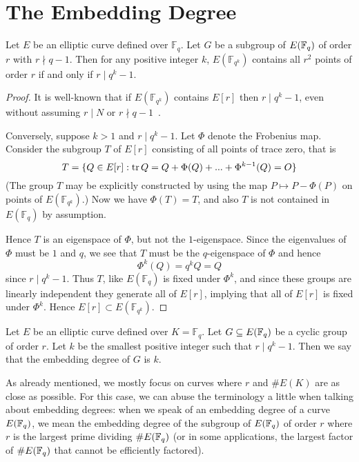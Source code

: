 \section {The Embedding Degree}

\begin{theorem} \cite{bk}
Let $E$ be an elliptic curve defined over $\mathbb{F}_q$.
Let $G$ be a subgroup of $E(\mathbb{F}_q)$ of order $r$ with
$r \nmid q-1$.
Then for any positive integer $k$,
$E(\mathbb{F}_{q^k})$ contains all $r^2$
points of order $r$ if and only if $r \mid q^k - 1$.
\end{theorem}

\begin{proof}
It is well-known that if $E(\mathbb{F}_{q^k})$ contains $E[r]$
then $r \mid q^k - 1$, even without assuming $r \mid N$ or
$r \nmid q-1$~\cite{bk}.

Conversely, suppose $k > 1$ and $r \mid q^k - 1$.
Let $\Phi$ denote the Frobenius map. Consider the subgroup $T$ of $E[r]$
consisting of all points of trace zero, that is
\[
T = \{ Q \in E[r] : \mathop{\rm tr} Q = Q + \Phi(Q) + ... + \Phi^{k-1}(Q) = O \}
\]
(The group $T$ may be explicitly constructed by using the map $P \mapsto
P - \Phi(P)$ on points of $E(\mathbb{F}_{q^k})$.)
Now we have $\Phi(T) = T$, and also $T$ is not contained
in $E(\mathbb{F}_q)$ by assumption.

Hence $T$ is an eigenspace of $\Phi$, but not the $1$-eigenspace. Since the
eigenvalues of $\Phi$ must be $1$ and $q$, we see that $T$ must be the
$q$-eigenspace of $\Phi$ and hence
\[
\Phi^k(Q) = q^k Q = Q
\]
since $r \mid q^k - 1$. Thus $T$, like $E(\mathbb{F}_q)$ is fixed under
$\Phi^k$, and since these groups are linearly independent they generate all
of $E[r]$, implying that all of $E[r]$ is fixed under $\Phi^k$. Hence
$E[r] \subset E(\mathbb{F}_{q^k})$.
\end{proof}

\begin{definition}
Let $E$ be an elliptic curve defined over $K = \mathbb{F}_q$.
Let $G \subseteq E(\mathbb{F}_q)$ be a cyclic group of order $r$.
Let $k$ be the smallest positive integer such that $r \mid q^k - 1$.
Then we say that the embedding degree of $G$ is $k$.
\end{definition}

As already mentioned, we mostly focus on curves where
$r$ and $\#E(K)$ are as close as possible.
For this case, we can abuse the terminology a little
when talking about embedding degrees: when we speak of an embedding degree
of a curve $E(\mathbb{F}_q)$, we mean the embedding degree of the subgroup of
$E(\mathbb{F}_q)$ of order $r$ where $r$ is the largest prime dividing $\#E(\mathbb{F}_q)$
(or in some applications, the largest factor of $\#E(\mathbb{F}_q)$ that cannot be
efficiently factored).

